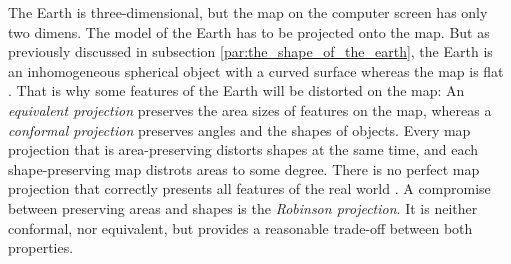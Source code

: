 The Earth is three-dimensional, but the map on the computer screen has only two dimens. The model of the Earth has to be projected onto the map. But as previously discussed in subsection \ref{par:the_shape_of_the_earth}, the Earth is an inhomogeneous spherical object with a curved surface whereas the map is flat
\cite[p.79]{bolstad2008gis}.
That is why some features of the Earth will be distorted on the map: An \emph{equivalent projection} preserves the area sizes of features on the map, whereas a \emph{conformal projection} preserves angles and the shapes of objects. Every map projection that is area-preserving distorts shapes at the same time, and each shape-preserving map distrots areas to some degree. There is no perfect map projection that correctly presents all features of the real world
\cite{mapProjectionGeokov}.
A compromise between preserving areas and shapes is the \emph{Robinson projection}. It is neither conformal, nor equivalent, but provides a reasonable trade-off between both properties.

